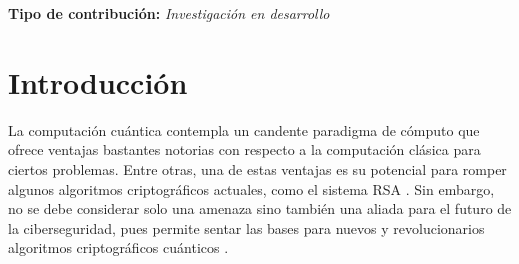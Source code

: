 \documentclass[10pt,conference,a4paper]{IEEEtran}
\begin{document}
    {\bf Tipo de contribución:}  {\it Investigación en desarrollo}


    \section{Introducción}
    La computación cuántica contempla un candente paradigma de cómputo que ofrece ventajas bastantes notorias con respecto a la computación clásica para ciertos problemas. Entre otras, una de estas ventajas es su potencial para romper algunos algoritmos criptográficos actuales, como el sistema RSA \cite{Shor} \cite{RSA}. Sin embargo, no se debe considerar solo una amenaza sino también una aliada para el futuro de la ciberseguridad, pues permite sentar las bases para nuevos y revolucionarios algoritmos criptográficos cuánticos \cite{BB84} \cite{BB2014} \cite{E91}.
\end{document}
